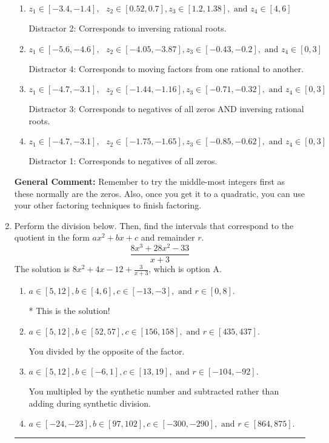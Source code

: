 \documentclass{extbook}[14pt]
\newcommand{\litem}[1]{\item #1

\rule{\textwidth}{0.4pt}}
\begin{document}
\begin{enumerate}
{\begin{enumerate}[label=\Alph*.]
* This is the solution!
\item \( z_1 \in [-3.4, -1.4], \text{   }  z_2 \in [0.52, 0.7], z_3 \in [1.2, 1.38], \text{   and   } z_4 \in [4, 6] \)

 Distractor 2: Corresponds to inversing rational roots.
\item \( z_1 \in [-5.6, -4.6], \text{   }  z_2 \in [-4.05, -3.87], z_3 \in [-0.43, -0.2], \text{   and   } z_4 \in [0, 3] \)

 Distractor 4: Corresponds to moving factors from one rational to another.
\item \( z_1 \in [-4.7, -3.1], \text{   }  z_2 \in [-1.44, -1.16], z_3 \in [-0.71, -0.32], \text{   and   } z_4 \in [0, 3] \)

 Distractor 3: Corresponds to negatives of all zeros AND inversing rational roots.
\item \( z_1 \in [-4.7, -3.1], \text{   }  z_2 \in [-1.75, -1.65], z_3 \in [-0.85, -0.62], \text{   and   } z_4 \in [0, 3] \)

 Distractor 1: Corresponds to negatives of all zeros.
\end{enumerate}

\textbf{General Comment:} Remember to try the middle-most integers first as these normally are the zeros. Also, once you get it to a quadratic, you can use your other factoring techniques to finish factoring.
}
\litem{
Perform the division below. Then, find the intervals that correspond to the quotient in the form $ax^2+bx+c$ and remainder $r$.
\[ \frac{8x^{3} +28 x^{2} -33}{x + 3} \]The solution is \( 8x^{2} +4 x -12 + \frac{3}{x + 3} \), which is option A.\begin{enumerate}[label=\Alph*.]
\item \( a \in [5, 12], b \in [4, 6], c \in [-13, -3], \text{ and } r \in [0, 8]. \)

* This is the solution!
\item \( a \in [5, 12], b \in [52, 57], c \in [156, 158], \text{ and } r \in [435, 437]. \)

 You divided by the opposite of the factor.
\item \( a \in [5, 12], b \in [-6, 1], c \in [13, 19], \text{ and } r \in [-104, -92]. \)

 You multipled by the synthetic number and subtracted rather than adding during synthetic division.
\item \( a \in [-24, -23], b \in [97, 102], c \in [-300, -290], \text{ and } r \in [864, 875]. \)


\end{enumerate}}
\end{enumerate}
\end{document}
